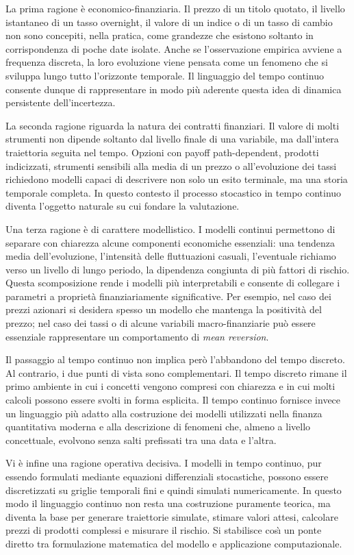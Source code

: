 La prima ragione \`{e} economico-finanziaria. Il prezzo di un titolo
quotato, il livello istantaneo di un tasso overnight, il valore di un
indice o di un tasso di cambio non sono concepiti, nella pratica, come
grandezze che esistono soltanto in corrispondenza di poche date isolate.
Anche se l'osservazione empirica avviene a frequenza discreta, la loro
evoluzione viene pensata come un fenomeno che si sviluppa lungo tutto
l'orizzonte temporale. Il linguaggio del tempo continuo consente dunque
di rappresentare in modo pi\`{u} aderente questa idea di dinamica
persistente dell'incertezza.

La seconda ragione riguarda la natura dei contratti finanziari. Il
valore di molti strumenti non dipende soltanto dal livello finale di una
variabile, ma dall'intera traiettoria seguita nel tempo. Opzioni con
payoff path-dependent, prodotti indicizzati, strumenti sensibili alla
media di un prezzo o all'evoluzione dei tassi richiedono modelli capaci
di descrivere non solo un esito terminale, ma una storia temporale
completa. In questo contesto il processo stocastico in tempo continuo
diventa l'oggetto naturale su cui fondare la valutazione.

Una terza ragione \`{e} di carattere modellistico. I modelli continui
permettono di separare con chiarezza alcune componenti economiche
essenziali: una tendenza media dell'evoluzione, l'intensit\`{a} delle
fluttuazioni casuali, l'eventuale richiamo verso un livello di lungo
periodo, la dipendenza congiunta di pi\`{u} fattori di rischio. Questa
scomposizione rende i modelli pi\`{u} interpretabili e consente di
collegare i parametri a propriet\`{a} finanziariamente significative.
Per esempio, nel caso dei prezzi azionari si desidera spesso un modello
che mantenga la positivit\`{a} del prezzo; nel caso dei tassi o di alcune
variabili macro-finanziarie pu\`{o} essere essenziale rappresentare un
comportamento di \emph{mean reversion}.

Il passaggio al tempo continuo non implica per\`{o} l'abbandono del tempo
discreto. Al contrario, i due punti di vista sono complementari. Il
tempo discreto rimane il primo ambiente in cui i concetti vengono
compresi con chiarezza e in cui molti calcoli possono essere svolti in
forma esplicita. Il tempo continuo fornisce invece un linguaggio pi\`{u}
adatto alla costruzione dei modelli utilizzati nella finanza
quantitativa moderna e alla descrizione di fenomeni che, almeno a livello
concettuale, evolvono senza salti prefissati tra una data e l'altra.

Vi \`{e} infine una ragione operativa decisiva. I modelli in tempo
continuo, pur essendo formulati mediante equazioni differenziali
stocastiche, possono essere discretizzati su griglie temporali fini e
quindi simulati numericamente. In questo modo il linguaggio continuo non
resta una costruzione puramente teorica, ma diventa la base per generare
traiettorie simulate, stimare valori attesi, calcolare prezzi di prodotti complessi e
misurare il rischio. Si stabilisce cos\`{\i} un ponte diretto tra
formulazione matematica del modello e applicazione computazionale.

